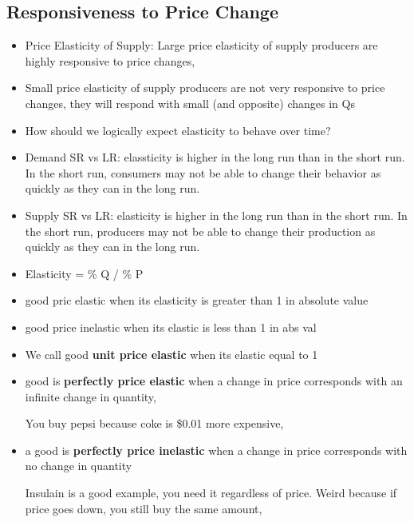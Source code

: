 \documentclass{article}
\begin{document}
\subsection{Responsiveness to Price Change}
\begin{itemize}
  \item Price Elasticity of Supply:
    Large price elasticity of supply \rightarrow{} producers are highly responsive to price changes,
  \item Small price elasticity of supply \rightarrow{} producers are not very responsive to price changes,
    they will respond with small (and opposite) changes in Qs
  \item How should we logically expect elasticity to behave over time?
  \item Demand SR vs LR: elassticity is higher in the long run than in the short run.
    In the short run, consumers may not be able to change their behavior
    as quickly as they can in the long run.
  \item Supply SR vs LR: elasticity is higher in the long run than in the short run.
    In the short run, producers may not be able to change their production
    as quickly as they can in the long run.
  \item Elasticity = \% \Delta Q / \% \Delta P
  \item good pric elastic when its elasticity is greater than 1 in absolute value
  \item good price inelastic when its elastic is less than 1 in abs val
  \item We call good \textbf{unit price elastic} when its elastic equal to 1


  \item good is \textbf{perfectly price elastic} when a change in price
    corresponds with an infinite change in quantity,

    You buy pepsi because coke is \$0.01 more expensive,
  \item a good is \textbf{perfectly price inelastic} when a change in price corresponds with no change in quantity

    Insulain is a good example, you need it regardless of price.
    Weird because if price goes down, you still buy the same amount,
\end{itemize}
\end{document}
